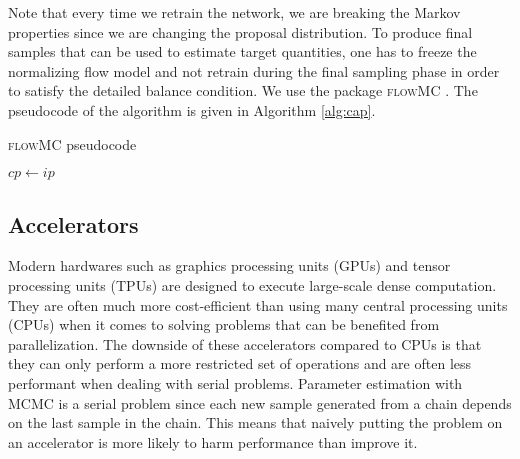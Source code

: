 \documentclass[twocolumn]{aastex631}
\begin{document}
Note that every time we retrain the network, we are breaking
the Markov properties since we are changing the proposal distribution. To
produce final samples that can be used to estimate target quantities, one has to
freeze the normalizing flow model and not retrain during the final sampling
phase in order to satisfy the detailed balance condition. We use the package
\textsc{flowMC} \cite{2022arXiv221106397W}. The pseudocode of the algorithm is
given in Algorithm \ref{alg:cap}.

\begin{algorithm}
\caption{\textsc{flowMC} pseudocode}\label{alg:cap}
$cp \leftarrow ip$\\

\end{algorithm}

\subsection{Accelerators}
\label{sec:accelerators}

Modern hardwares such as graphics processing units (GPUs) and
tensor processing units (TPUs) are designed to execute large-scale dense
computation. They are often much more cost-efficient than using many central
processing units (CPUs) when it comes to solving problems that can be benefited
from parallelization.  The downside of these accelerators compared to CPUs is
that they can only perform a more restricted set of operations and are often
less performant when dealing with serial problems. Parameter estimation with
MCMC is a serial problem since each new sample generated from a chain depends
on the last sample in the chain. This means that naively putting the problem on
an accelerator is more likely to harm performance than improve it.
\end{document}
